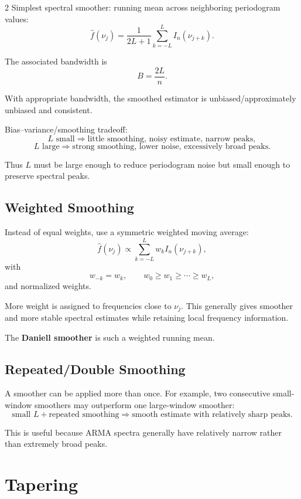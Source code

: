 \documentclass[9pt,a4paper]{extarticle}
\newcommand{\key}[1]{\textbf{#1}}
\begin{document}
\begin{multicols}{2}
Simplest spectral smoother: running mean across neighboring periodogram values:
\[
\boxed{
\widehat f(\nu_j)=
\frac{1}{2L+1}
\sum_{k=-L}^{L}
I_n(\nu_{j+k}).
}
\]

The associated bandwidth is
\[
\boxed{B=\frac{2L}{n}.}
\]

With appropriate bandwidth, the smoothed estimator is unbiased/approximately unbiased and consistent.

Bias--variance/smoothing tradeoff:
\[
\boxed{
L\text{ small}
\Rightarrow
\text{little smoothing, noisy estimate, narrow peaks},
}
\]
\[
\boxed{
L\text{ large}
\Rightarrow
\text{strong smoothing, lower noise, excessively broad peaks}.
}
\]

Thus \(L\) must be large enough to reduce periodogram noise but small enough to preserve spectral peaks.

\subsection{Weighted Smoothing}

Instead of equal weights, use a symmetric weighted moving average:
\[
\widehat f(\nu_j)
\propto
\sum_{k=-L}^{L}
w_k I_n(\nu_{j+k}),
\]
with
\[
\boxed{
w_{-k}=w_k,\qquad
w_0\ge w_1\ge\cdots\ge w_L,
}
\]
and normalized weights.

More weight is assigned to frequencies close to \(\nu_j\). This generally gives smoother and more stable spectral estimates while retaining local frequency information.

The \key{Daniell smoother} is such a weighted running mean.

\subsection{Repeated/Double Smoothing}

A smoother can be applied more than once. For example, two consecutive small-window smoothers may outperform one large-window smoother:
\[
\boxed{
\text{small }L+\text{repeated smoothing}
\Rightarrow
\text{smooth estimate with relatively sharp peaks}.
}
\]

This is useful because ARMA spectra generally have relatively narrow rather than extremely broad peaks.

\section{Tapering}


\end{multicols}
\end{document}
